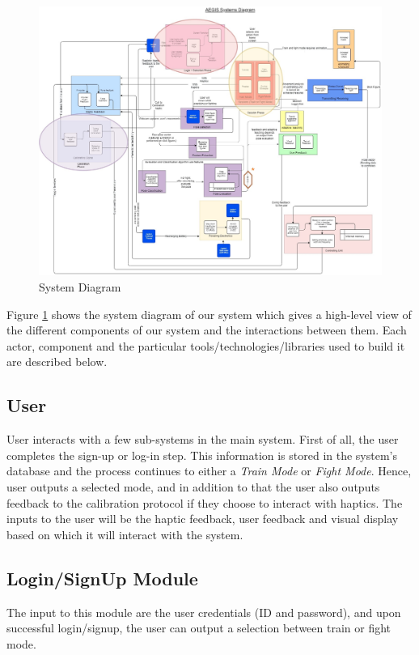 \begin{figure}
    \centering
    \includegraphics[scale=0.4]{images/SystemDiagram.png}
    \caption{System Diagram}
    \label{fig:systemDiagram}
\end{figure}

\clearpage

Figure \ref{fig:systemDiagram} shows the system diagram of our system which gives a high-level view of the different components of our system and the interactions between them. Each actor, component and the particular tools/technologies/libraries used to build it are described below.

\subsection{User}
User interacts with a few sub-systems in the main system. First of all, the user completes the sign-up or log-in step. This information is stored in the system's database and the process continues to either a \textit{Train Mode} or \textit{Fight Mode}. Hence, user outputs a selected mode, and in addition to that the user also outputs feedback to the calibration protocol if they choose to interact with haptics. The inputs to the user will be the haptic feedback, user feedback and visual display based on which it will interact with the system.

\subsection{Login/SignUp Module}
The input to this module are the user credentials (ID and password), and upon successful login/signup, the user can output a selection between train or fight mode.

